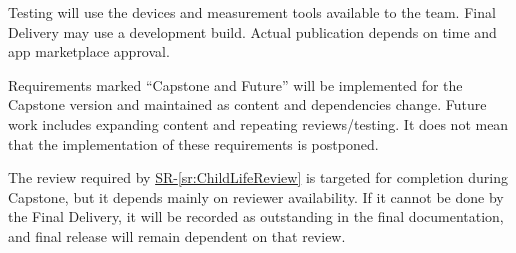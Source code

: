 \documentclass{article}
\newcounter{sr}
\newcommand{\srref}[1]{\hyperref[sr:#1]{SR-\ref*{sr:#1}}}
\begin{document}
Testing will use the devices and measurement tools available to the team. Final Delivery may use a
development build. Actual publication depends on time and app marketplace approval.

Requirements marked ``Capstone and Future'' will be implemented for the Capstone
version and maintained as content and dependencies change.
Future work includes expanding content and repeating reviews/testing. It does not mean that the implementation of
these requirements is postponed.

The review required by \srref{ChildLifeReview} is targeted for completion during
Capstone, but it depends mainly on reviewer availability. If it cannot be done by the
Final Delivery, it will be recorded as outstanding in the final documentation, and final release will remain dependent on
that review.
\end{document}
